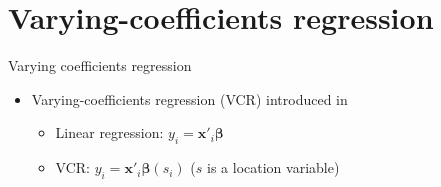 \documentclass{beamer}
\begin{document}
    \section{Varying-coefficients regression}
    \begin{frame}{Varying coefficients regression}
        \begin{itemize}
            \item Varying-coefficients regression (VCR) introduced in \cite{Hastie:1993a}
            \begin{itemize}
                \item Linear regression: $y_i = \bm{x}'_i\bm{\beta}$
                \item VCR: $y_i = \bm{x}'_i\bm{\beta}(s_i)$ ($s$ is a location variable)
            \end{itemize}
        \end{itemize}
        
        \vspace{-5mm}
        \begin{figure}
        \begin{center}
        \end{center}
        \end{figure}

    \end{frame}
       
\end{document}
